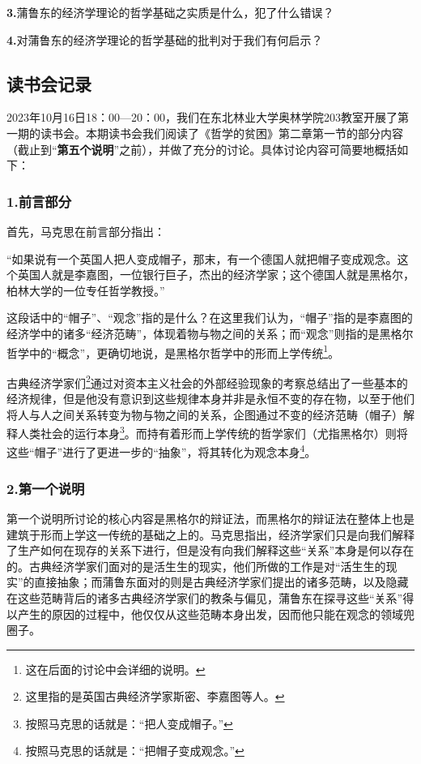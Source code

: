 \documentclass[a4paper,twoside,12pt,AutoFakeBold]{ctexart}
\begin{document}
\textbf{3.}蒲鲁东的经济学理论的哲学基础之实质是什么，犯了什么错误？

\textbf{4.}对蒲鲁东的经济学理论的哲学基础的批判对于我们有何启示？

\subsection{读书会记录}
2023年10月16日18：00—20：00，我们在东北林业大学奥林学院203教室开展了第一期的读书会。本期读书会我们阅读了《哲学的贫困》第二章第一节的部分内容（截止到“\textbf{第五个说明}”之前），并做了充分的讨论。具体讨论内容可简要地概括如下：

\subsubsection{1.前言部分}\label{sec:3}

首先，马克思在前言部分指出：
\begin{adjustwidth}{2em}{2em}
\qquad\fangsong
“如果说有一个英国人把人变成帽子，那末，有一个德国人就把帽子变成观念。这个英国人就是李嘉图，一位银行巨子，杰出的经济学家；这个德国人就是黑格尔，柏林大学的一位专任哲学教授。”
\end{adjustwidth}

这段话中的“帽子”、“观念”指的是什么？在这里我们认为，“帽子”指的是李嘉图的经济学中的诸多“经济范畴”，体现着物与物之间的关系；而“观念”则指的是黑格尔哲学中的“概念”，更确切地说，是黑格尔哲学中的形而上学传统\footnote{这在后面的讨论中会详细的说明。}。

古典经济学家们\footnote{这里指的是英国古典经济学家斯密、李嘉图等人。}通过对资本主义社会的外部经验现象的考察总结出了一些基本的经济规律，但是他没有意识到这些规律本身并非是永恒不变的存在物，以至于他们将人与人之间关系转变为物与物之间的关系，企图通过不变的经济范畴（帽子）解释人类社会的运行本身\footnote{按照马克思的话就是：“把人变成帽子。”}。而持有着形而上学传统的哲学家们（尤指黑格尔）则将这些“帽子”进行了更进一步的“抽象”，将其转化为观念本身\footnote{按照马克思的话就是：“把帽子变成观念。”}。

\subsubsection{2.第一个说明}

第一个说明所讨论的核心内容是黑格尔的辩证法，而黑格尔的辩证法在整体上也是建筑于形而上学这一传统的基础之上的。马克思指出，经济学家们只是向我们解释了生产如何在现存的关系下进行，但是没有向我们解释这些“关系”本身是何以存在的。古典经济学家们面对的是活生生的现实，他们所做的工作是对“活生生的现实”的直接抽象；而蒲鲁东面对的则是古典经济学家们提出的诸多范畴，以及隐藏在这些范畴背后的诸多古典经济学家们的教条与偏见，蒲鲁东在探寻这些“关系”得以产生的原因的过程中，他仅仅从这些范畴本身出发，因而他只能在观念的领域兜圈子。
\end{document}

